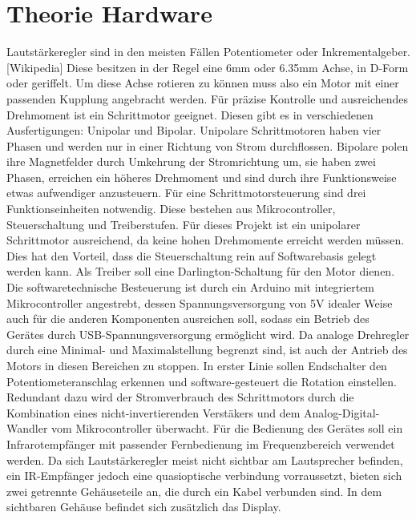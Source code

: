 \documentclass[11pt, titlepage, fleqn]{report}
\begin{document}
		\section{Theorie Hardware}
		\label{sec:Theorie Hardware}
			\sloppy \nohyphens{
			Lautstärkeregler sind in den meisten Fällen Potentiometer oder Inkrementalgeber. [Wikipedia\cite{Lautstärkeregler}] 
			Diese besitzen in der Regel eine 6mm oder 6.35mm Achse, in D-Form oder geriffelt. Um diese Achse rotieren zu können muss also ein Motor mit einer passenden Kupplung angebracht werden. Für präzise Kontrolle und ausreichendes Drehmoment ist ein Schrittmotor geeignet. Diesen gibt es in verschiedenen Ausfertigungen: Unipolar und Bipolar. Unipolare Schrittmotoren haben vier Phasen und werden nur in einer Richtung von Strom durchflossen. Bipolare polen ihre Magnetfelder durch Umkehrung der Stromrichtung um, sie haben zwei Phasen, erreichen ein höheres Drehmoment und sind durch ihre Funktionsweise etwas aufwendiger anzusteuern. Für eine Schrittmotorsteuerung sind drei Funktionseinheiten notwendig. Diese bestehen aus Mikrocontroller, Steuerschaltung und Treiberstufen. Für dieses Projekt ist ein unipolarer Schrittmotor ausreichend, da keine hohen Drehmomente erreicht werden müssen. Dies hat den Vorteil, dass die Steuerschaltung rein auf Softwarebasis gelegt werden kann. Als Treiber soll eine Darlington-Schaltung für den Motor dienen. Die softwaretechnische Besteuerung ist durch ein Arduino mit integriertem Mikrocontroller angestrebt, dessen Spannungsversorgung von 5V idealer Weise auch für die anderen Komponenten ausreichen soll, sodass ein Betrieb des Gerätes durch USB-Spannungsversorgung ermöglicht wird. Da analoge Drehregler durch eine Minimal- und Maximalstellung begrenzt sind, ist auch der Antrieb des Motors in diesen Bereichen zu stoppen. In erster Linie sollen Endschalter den Potentiometeranschlag erkennen und software-gesteuert die Rotation einstellen. Redundant dazu wird der Stromverbrauch des Schrittmotors durch die Kombination eines nicht-invertierenden Verstäkers und dem Analog-Digital-Wandler vom Mikrocontroller überwacht. Für die Bedienung des Gerätes soll ein Infrarotempfänger mit passender Fernbedienung im Frequenzbereich verwendet werden. Da sich Lautstärkeregler meist nicht sichtbar am Lautsprecher befinden, ein IR-Empfänger jedoch eine quasioptische verbindung vorraussetzt, bieten sich zwei getrennte Gehäuseteile an, die durch ein Kabel verbunden sind. In dem sichtbaren Gehäuse befindet sich zusätzlich das Display.}
		\newpage
\end{document}
